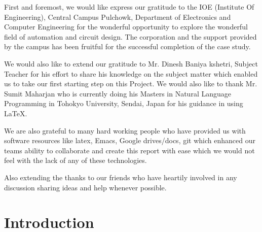 \documentclass[12pt]{article}
\begin{document}
First and foremost, we would like express our gratitude to the IOE (Institute Of Engineering), Central Campus Pulchowk, Department of Electronics and Computer Engineering for the wonderful opportunity to explore the wonderful field of automation and circuit design. The corporation and the support provided by the campus has been fruitful for the successful completion of the case study.
\par
We would also like to extend our gratitude to Mr. Dinesh Baniya kshetri, Subject Teacher for  his effort to share his knowledge on the subject matter which enabled us to take our first starting step on this Project. We would also like to thank  Mr. Sumit Maharjan who is currently doing his Masters in Natural Language Programming in Tohokyo University, Sendai, Japan for his guidance in using LaTeX.\par
We are also grateful to many hard working people who have provided us with software resources like latex, Emacs, Google drives/docs, git which enhanced our teams ability to collaborate and create this report with ease which we would not feel with the lack of any of these technologies.
\par
Also extending the thanks to our friends who have heartily involved in any discussion sharing ideas and help whenever possible.

\newpage



\tableofcontents
\newpage
\renewcommand{\thesection}{\arabic{section}} 
\section{Introduction}
\end{document}

